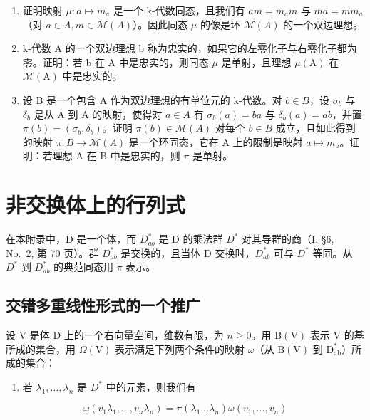 \begin{enumerate}
\def\labelenumi{\alph{enumi})}
\item
  证明映射 \(\mu: a \mapsto m_{a}\) 是一个 k-代数同态，且我们有 \(am = m_{a}m\) 与 \(ma = mm_{a}\)（对 \(a \in A, m \in \mathcal{M}(A)\)）。因此同态 \(\mu\) 的像是环 \(\mathcal{M}(A)\) 的一个双边理想。
\item
  k-代数 A 的一个双边理想 b 称为忠实的，如果它的左零化子与右零化子都为零。证明：若 b 在 A 中是忠实的，则同态 \(\mu\) 是单射，且理想 \(\mu(\mathrm{A})\) 在 \(\mathcal{M}(\mathrm{A})\) 中是忠实的。
\item
  设 B 是一个包含 A 作为双边理想的有单位元的 k-代数。对 \(b \in B\)，设 \(\sigma_{b}\) 与 \(\delta_{b}\) 是从 A 到 A 的映射，使得对 \(a \in A\) 有 \(\sigma_{b}(a) = ba\) 与 \(\delta_{b}(a) = ab\)，并置 \(\pi(b) = (\sigma_{b}, \delta_{b})\)。证明 \(\pi(b) \in \mathcal{M}(A)\) 对每个 \(b \in B\) 成立，且如此得到的映射 \(\pi : B \to \mathcal{M}(A)\) 是一个环同态，它在 A 上的限制是映射 \(a \mapsto m_{a}\)。证明：若理想 A 在 B 中是忠实的，则 \(\pi\) 是单射。
\end{enumerate}

\chapter{非交换体上的行列式}

在本附录中，D 是一个体，而 \(D_{ab}^{*}\) 是 D 的乘法群 \(D^{*}\) 对其导群的商（I, §6, No.~2, 第 70 页）。群 \(D_{ab}^{*}\) 是交换的，且当体 D 交换时，\(D_{ab}^{*}\) 可与 \(D^{*}\) 等同。从 \(D^{*}\) 到 \(D_{ab}^{*}\) 的典范同态用 \(\pi\) 表示。

\section{交错多重线性形式的一个推广}

设 \(\mathrm{V}\) 是体 \(\mathrm{D}\) 上的一个右向量空间，维数有限，为 \(n \geqslant 0\)。用 \(\mathrm{B(V)}\) 表示 \(\mathrm{V}\) 的基所成的集合，用 \(\Omega(\mathrm{V})\) 表示满足下列两个条件的映射 \(\omega\)（从 \(\mathrm{B(V)}\) 到 \(\mathrm{D}_{\mathrm{ab}}^{*}\)）所成的集合：

\begin{enumerate}
\def\labelenumi{\alph{enumi})}
\tightlist
\item
  若 \(\lambda_1, \ldots, \lambda_n\) 是 \(D^*\) 中的元素，则我们有
\end{enumerate}

\[
\omega (v _ {1} \lambda_ {1}, \ldots , v _ {n} \lambda_ {n}) = \pi (\lambda_ {1} \dots \lambda_ {n}) \omega (v _ {1}, \ldots , v _ {n})\tag{1}
\]

